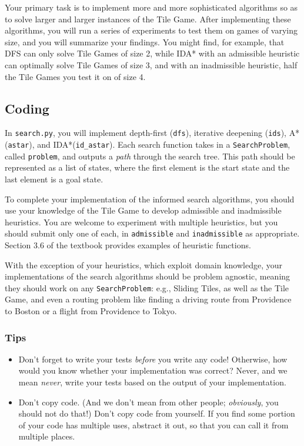 \documentclass{article}
\begin{document}
Your primary task is to implement more and more sophisticated
algorithms so as to solve larger and larger instances of the Tile
Game.  After implementing these algorithms, you will run a series of
experiments to test them on games of varying size, and you will
summarize your findings.  You might find, for example, that DFS can
only solve Tile Games of size 2, while IDA* with an admissible
heuristic can optimally solve Tile Games of size 3, and with an
inadmissible heuristic, half the Tile Games you test it on of size 4.


\subsection{Coding}

In \verb|search.py|, you will implement depth-first (\verb|dfs|), iterative deepening (\verb|ids|),
A* (\verb|astar|), and IDA*(\verb|id_astar|).
Each search function takes in a \verb|SearchProblem|, called \verb|problem|,
and outputs a \textit{path\/} through the search tree.
This path should be represented as a list of states, where the first
element is the start state and the last element is a goal state.

To complete your implementation of the informed search algorithms,
you should use your knowledge of the Tile Game to develop
admissible and inadmissible heuristics.
You are welcome to experiment with multiple heuristics,
but you should submit only one of each,
in \verb|admissible| and \verb|inadmissible| as appropriate.
Section 3.6 of the textbook provides examples of heuristic functions.

With the exception of your heuristics, which exploit domain knowledge,
your implementations of the search algorithms should be problem agnostic,
meaning they should work on any \verb|SearchProblem|:
e.g., Sliding Tiles, as well as the Tile Game,
and even a routing problem like finding a driving route from Providence
to Boston or a flight from Providence to Tokyo.


\subsubsection*{Tips}

\begin{itemize}

\item
  Don't forget to write your tests \emph{before\/} you write any code!
  Otherwise, how would you know whether your implementation was correct?
  Never, and we mean \emph{never\/}, write your tests based on the output of your implementation.

\item
  Don't copy code.
  (And we don't mean from other people; \emph{obviously}, you should not do that!)
  Don't copy code from yourself.
  If you find some portion of your code has multiple uses,
  abstract it out, so that you can call it from multiple places.

\end{itemize}
\end{document}
